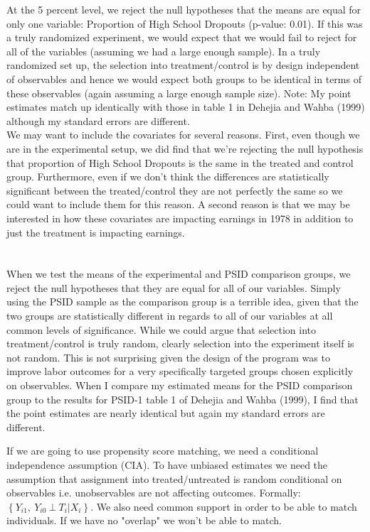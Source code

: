 \documentclass[11pt]{article}
\theoremstyle{definition}
\begin{document}
At the 5 percent level, we reject the null hypotheses that the means are equal for only one variable: Proportion of High School Dropouts (p-value: 0.01).  If this was a truly randomized experiment, we would expect that we would fail to reject for all of the variables (assuming we had a large enough sample).  In a truly randomized set up, the selection into treatment/control is by design independent of observables and hence we would expect both groups to be identical in terms of these observables (again assuming a large enough sample size).  Note: My point estimates match up identically with those in table 1 in Dehejia and Wahba (1999) although my standard errors are different. \\

We may want to include the covariates for several reasons.  First, even though we are in the experimental setup, we did find that we're rejecting the null hypothesis that proportion of High School Dropouts is the same in the treated and control group.  Furthermore, even if we don't think the differences are statistically significant between the treated/control they are not perfectly the same so we could want to include them for this reason.  A second reason is that we may be interested in how these covariates are impacting earnings in 1978 in addition to just the treatment is impacting earnings.


\section{}
\indent
\par
When we test the means of the experimental and PSID comparison groups, we reject the null hypotheses that they are equal for all of our variables.  Simply using the PSID sample as the comparison group is a terrible idea, given that the two groups are statistically different in regards to all of our variables at all common levels of significance.  While we could argue that selection into treatment/control is truly random, clearly selection into the experiment itself is not random.  This is not surprising given the design of the program was to improve labor outcomes for a very specifically targeted groups chosen explicitly on observables. When I compare my estimated means for the PSID comparison group to the results for PSID-1 table 1 of Dehejia and Wahba (1999), I find that the point estimates are nearly identical but again my standard errors are different.    

If we are going to use propensity score matching, we need a conditional independence assumption (CIA).  To have unbiased estimates we need the assumption that assignment into treated/untreated is random conditional on observables i.e. unobservables are not affecting outcomes.  Formally: $\left\{Y_{i1}, \ Y_{i0} \ \bot \ T_{i}|X_{i}\right\}$.  We also need common support in order to be able to match individuals.  If we have no "overlap" we won't be able to match.
\end{document}
